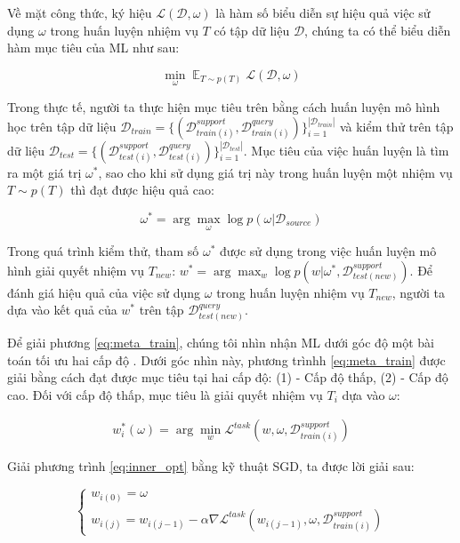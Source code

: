 Về mặt công thức, ký hiệu $\mathcal{L}(\mathcal{D}, \omega)$ là hàm số biểu diễn sự hiệu quả việc sử dụng $\omega$ trong huấn luyện nhiệm vụ $T$ có tập dữ liệu $\mathcal{D}$, chúng ta có thể biểu diễn hàm mục tiêu của ML như sau:

\begin{equation}
    \min_{\omega} \mathop{\mathbb{E}}_{T\sim p(T)} \mathcal{L}(\mathcal{D}, \omega)
\end{equation}

Trong thực tế, người ta thực hiện mục tiêu trên bằng cách huấn luyện mô hình học trên tập dữ liệu $\mathcal{D}_{train} = \{(\mathcal{D}_{train(i)}^{support}, \mathcal{D}_{train(i)}^{query})\}_{i=1}^{|\mathcal{D}_{train}|}$ và kiểm thử trên tập dữ liệu $\mathcal{D}_{test} = \{(\mathcal{D}_{test(i)}^{support}, \mathcal{D}_{test(i)}^{query})\}_{i=1}^{|\mathcal{D}_{test}|}$. Mục tiêu của việc huấn luyện là tìm ra một giá trị $\omega^*$, sao cho khi sử dụng giá trị này trong huấn luyện một nhiệm vụ $T\sim p(T)$ thì đạt được hiệu quả cao:

\begin{dmath}
    \label{eq:meta_train}
    \omega^* = \arg \max_{\omega} \log{p(\omega|\mathcal{D}_{source})}
\end{dmath}

Trong quá trình kiểm thử, tham số $\omega^*$ được sử dụng trong việc huấn luyện mô hình giải quyết nhiệm vụ $T_{new}$: $w^* = \arg \max_{w} \log{p(w|\omega^*, \mathcal{D}_{test(new)}^{support})}$. Để đánh giá hiệu quả của việc sử dụng $\omega$ trong huấn luyện nhiệm vụ $T_{new}$, người ta dựa vào kết quả của $w^*$ trên tập $\mathcal{D}_{test(new)}^{query}$.

Để giải phương \ref{eq:meta_train}, chúng tôi nhìn nhận ML dưới góc độ một bài toán tối ưu hai cấp độ \cite{hospedales2020meta}. Dưới góc nhìn này, phương trìnhh \ref{eq:meta_train} được giải bằng cách đạt được mục tiêu tại hai cấp độ: (1) - Cấp độ thấp, (2) - Cấp độ cao. Đối với cấp độ thấp, mục tiêu là giải quyết nhiệm vụ $T_i$ dựa vào $\omega$:

\begin{eqnarray}
    \label{eq:inner_opt}
    w^*_i(\omega) = \arg \min_{w} \mathcal{L}^{task}(w, \omega, \mathcal{D}_{train(i)}^{support})
\end{eqnarray}

Giải phương trình \ref{eq:inner_opt} bằng kỹ thuật SGD, ta được lời giải sau:

\begin{equation}
    \label{sol:inner_opt}
    \begin{cases}
        w_{i(0)} = \omega\\
        w_{i(j)} = w_{i(j-1)} - \alpha \nabla \mathcal{L}^{task}(w_{i(j-1)}, \omega, \mathcal{D}_{train(i)}^{support})
    \end{cases}
\end{equation}

